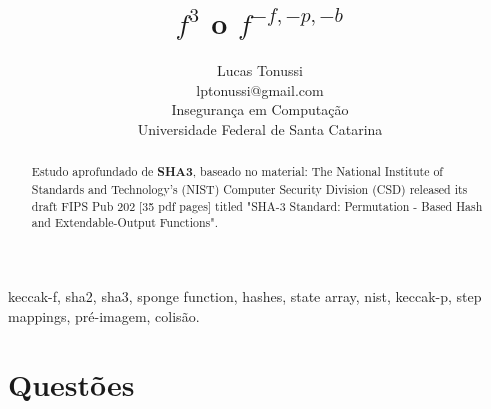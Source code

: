 \documentclass[conference]{IEEEtran}
\title{$f^3$ o $f^{-f, -p, -b}$}
\author{Lucas Tonussi\\lptonussi@gmail.com\\Insegurança em 
Computação\\Universidade Federal de Santa Catarina}
\begin{document}
\maketitle

\begin{abstract}
Estudo aprofundado de \textbf{SHA3}, baseado no material: The National Institute
of Standards and Technology's (NIST) Computer Security Division (CSD) released
its draft FIPS Pub 202 [35 pdf pages] titled "SHA-3 Standard: Permutation -
Based Hash and Extendable-Output Functions".
\end{abstract}

\IEEEoverridecommandlockouts

\begin{keywords}
keccak-f, sha2, sha3, sponge function, hashes, state array, nist, keccak-p, 
step mappings, pré-imagem, colisão.
\end{keywords}

\IEEEpeerreviewmaketitle

\section{Questões}
\end{document}
